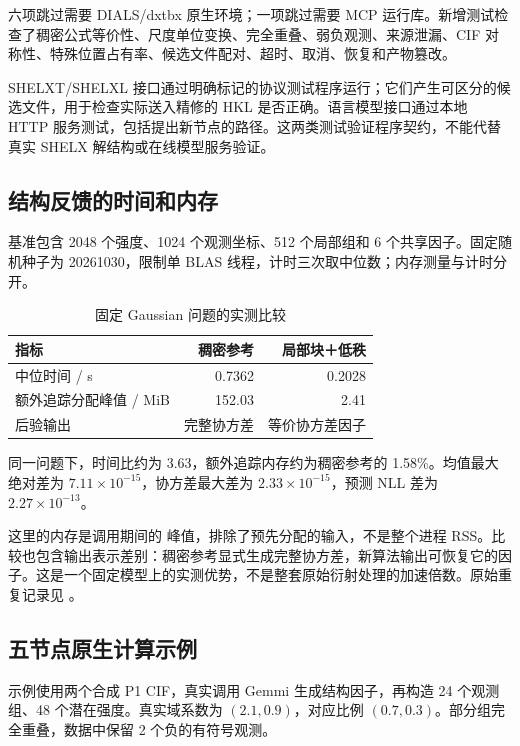 \documentclass[UTF8,11pt,a4paper,fontset=fandol]{ctexart}
\newcommand{\code}[1]{\texttt{\detokenize{#1}}}
\begin{document}
六项跳过需要 DIALS/dxtbx 原生环境；一项跳过需要 MCP 运行库。新增测试检查了稠密公式等价性、尺度单位变换、完全重叠、弱负观测、来源泄漏、CIF 对称性、特殊位置占有率、候选文件配对、超时、取消、恢复和产物篡改。

SHELXT/SHELXL 接口通过明确标记的协议测试程序运行；它们产生可区分的候选文件，用于检查实际送入精修的 HKL 是否正确。语言模型接口通过本地 HTTP 服务测试，包括提出新节点的路径。这两类测试验证程序契约，不能代替真实 SHELX 解结构或在线模型服务验证。

\subsection{结构反馈的时间和内存}

基准包含 2048 个强度、1024 个观测坐标、512 个局部组和 6 个共享因子。固定随机种子为 20261030，限制单 BLAS 线程，计时三次取中位数；内存测量与计时分开。

\begin{table}[htbp]
\centering\caption{固定 Gaussian 问题的实测比较}
\begin{tabularx}{\textwidth}{@{}Yrr@{}}
\toprule 指标 & 稠密参考 & 局部块＋低秩\\\midrule
中位时间 / s & 0.7362 & 0.2028\\
额外追踪分配峰值 / MiB & 152.03 & 2.41\\
后验输出 & 完整协方差 & 等价协方差因子\\
\bottomrule
\end{tabularx}
\end{table}

同一问题下，时间比约为 3.63，额外追踪内存约为稠密参考的 1.58\%。均值最大绝对差为 $7.11\times10^{-15}$，协方差最大差为 $2.33\times10^{-15}$，预测 NLL 差为 $2.27\times10^{-13}$。

这里的内存是调用期间的 \code{tracemalloc} 峰值，排除了预先分配的输入，不是整个进程 RSS。比较也包含输出表示差别：稠密参考显式生成完整协方差，新算法输出可恢复它的因子。这是一个固定模型上的实测优势，不是整套原始衍射处理的加速倍数。原始重复记录见 。

\subsection{五节点原生计算示例}

示例使用两个合成 P1 CIF，真实调用 Gemmi 生成结构因子，再构造 24 个观测组、48 个潜在强度。真实域系数为 $(2.1,0.9)$，对应比例 $(0.7,0.3)$。部分组完全重叠，数据中保留 2 个负的有符号观测。
\end{document}
